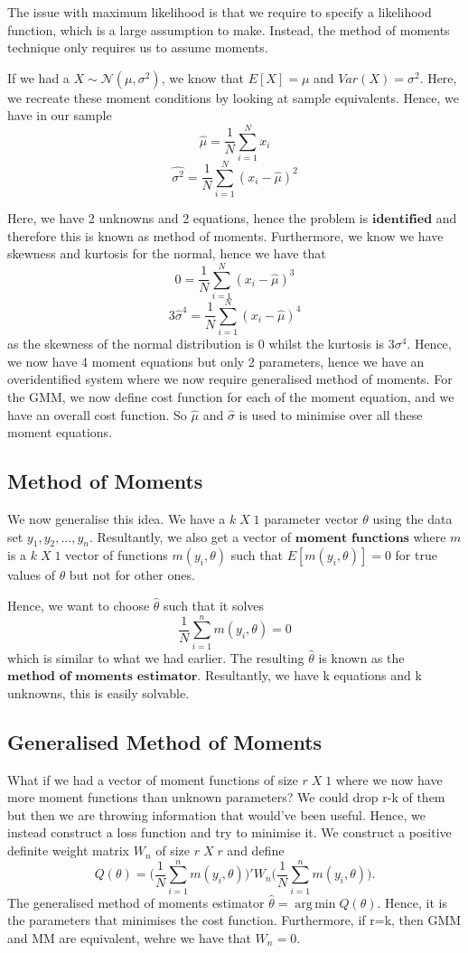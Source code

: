 \documentclass[twoside]{article}
\DeclareMathOperator*{\argmin}{arg\,min}
\begin{document}
The issue with maximum likelihood is that we require to specify a likelihood function, which is a large assumption to make. Instead, the method of moments technique only requires us to assume moments. 

If we had a $X \sim \mathcal{N}(\mu, \sigma^2)$, we know that $E[X] = \mu$ and $Var(X) = \sigma^2$. Here, we recreate these moment conditions by looking at sample equivalents. Hence, we have in our sample
$$
\hat{\mu} = \frac{1}{N}\sum_{i=1}^Nx_i
$$
$$
\hat{\sigma^2} = \frac{1}{N}\sum_{i=1}^N(x_i - \hat{\mu})^2
$$

Here, we have 2 unknowns and 2 equations, hence the problem is $\textbf{identified}$ and therefore this is known as method of moments.  Furthermore, we know we have skewness and kurtosis for the normal, hence we have that
$$
0 = \frac{1}{N}\sum_{i=1}^N(x_i - \hat{\mu})^3
$$
$$
3\hat{\sigma}^4 = \frac{1}{N}\sum_{i=1}^N(x_i - \hat{\mu})^4
$$
as the skewness of the normal distribution is 0 whilst the kurtosis is $3\sigma^4$. Hence, we now have 4 moment equations but only 2 parameters, hence we have an overidentified system where we now require generalised method of moments. For the GMM, we now define cost function for each of the moment equation, and we have an overall cost function. So $\hat{\mu}$ and $\hat{\sigma}$ is used to minimise over all these moment equations.

\subsection{Method of Moments}

We now generalise this idea. We have a $k \;X \;1$ parameter vector $\theta$  using the data set $y_1,y_2,...,y_n$. Resultantly, we also get a vector of $\textbf{moment functions}$ where $\mathit{m}$ is a $k \; X \; 1$ vector of functions $m(y_i, \theta)$ such that $E[m(y_i,\theta)] = 0$ for true values of $\theta$ but not for other ones. 

Hence, we want to choose $\hat{\theta}$ such that it solves
$$
\frac{1}{N}\sum_{i=1}^nm(y_i,\theta) = 0
$$
which is similar to what we had earlier. The resulting $\hat{\theta}$ is known as the $\textbf{method of moments estimator}$. Resultantly, we have k equations and k unknowns, this is easily solvable.

\subsection{Generalised Method of Moments}
What if we had a vector of moment functions of size $r \;X\; 1$ where we now have more moment functions than unknown parameters? We could drop r-k of them but then we are throwing information that would've been useful. Hence, we instead construct a loss function and try to minimise it. We construct a positive definite weight matrix $W_n$ of size $r \; X \; r$ and define
$$
Q(\theta) = \big(\frac{1}{N}\sum_{i=1}^nm(y_i,\theta)\big)'W_n\big(\frac{1}{N}\sum_{i=1}^nm(y_i,\theta)\big).
$$
The generalised method of moments estimator $\hat{\theta} = \argmin Q(\theta)$. Hence, it is the parameters that minimises the cost function. Furthermore, if r=k, then GMM and MM are equivalent, wehre we have that $W_n = 0$.
\end{document}
